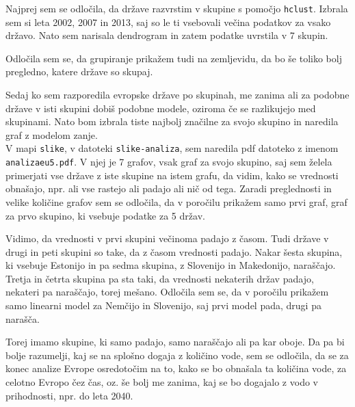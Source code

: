 \documentclass[11pt,a4paper]{article}
\begin{document}
Najprej sem se odločila, da države razvrstim v skupine s pomočjo \verb|hclust|. Izbrala sem si leta 2002, 2007 in 2013, saj so le ti vsebovali večina podatkov za vsako državo. Nato sem narisala dendrogram in zatem podatke uvrstila v 7 skupin.


\newpage
Odločila sem se, da grupiranje prikažem tudi na zemljevidu, da bo še toliko bolj pregledno, katere države so skupaj.


Sedaj ko sem razporedila evropske države po skupinah, me zanima ali za podobne države v isti skupini dobiš podobne modele, oziroma če se razlikujejo med skupinami. Nato bom izbrala tiste najbolj značilne za svojo skupino in naredila graf z modelom zanje.\\

V mapi \verb|slike|, v datoteki \verb|slike-analiza|, sem naredila pdf datoteko z imenom \verb|analizaeu5.pdf|. V njej je 7 grafov, vsak graf za svojo skupino, saj sem želela primerjati vse države z iste skupine na istem grafu, da vidim, kako se vrednosti obnašajo, npr. ali vse rastejo ali padajo ali nič od tega. Zaradi preglednosti in velike količine grafov sem se odločila, da v poročilu prikažem samo prvi graf, graf za prvo skupino, ki vsebuje podatke za 5 držav.


Vidimo, da vrednosti v prvi skupini večinoma padajo z časom. Tudi države v drugi in peti skupini so take, da z časom vrednosti padajo. Nakar šesta skupina, ki vsebuje Estonijo in pa sedma skupina, z Slovenijo in Makedonijo, naraščajo. Tretja in četrta skupina pa sta taki, da vrednosti nekaterih držav padajo, nekateri pa naraščajo, torej mešano. Odločila sem se, da v poročilu prikažem samo linearni model za Nemčijo in Slovenijo, saj prvi model pada, drugi pa narašča.


Torej imamo skupine, ki samo padajo, samo naraščajo ali pa kar oboje. Da pa bi bolje razumelji, kaj se na splošno dogaja z količino vode, sem se odločila, da se za konec analize Evrope osredotočim na to, kako se bo obnašala ta količina vode, za celotno Evropo čez čas, oz. še bolj me zanima, kaj se bo dogajalo z vodo v prihodnosti, npr. do leta 2040.
\end{document}
